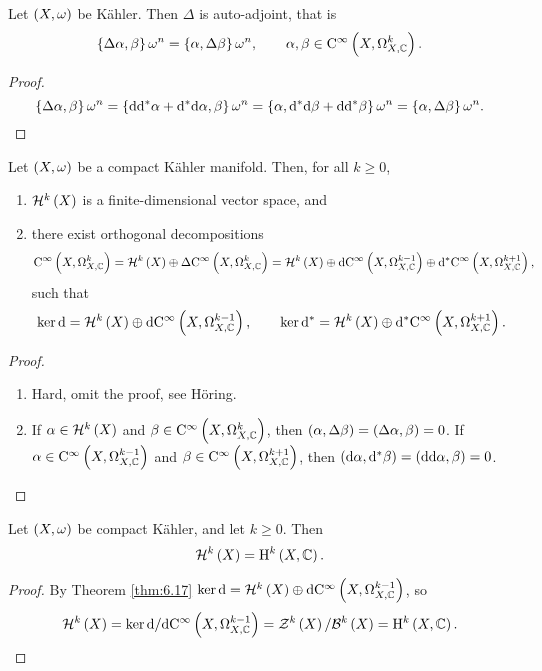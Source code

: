 \begin{lemma}
Let $ \br{X, \omega} $ be K\"ahler. Then $ \Delta $ is auto-adjoint, that is
$$ \cbr{\Delta\alpha, \beta}\omega^n = \cbr{\alpha, \Delta\beta}\omega^n, \qquad \alpha, \beta \in \COC{X}{k}. $$
\end{lemma}

\begin{proof}
$$ \cbr{\Delta\alpha, \beta}\omega^n = \cbr{\d\d^*\alpha + \d^*\d\alpha, \beta}\omega^n = \cbr{\alpha, \d^*\d\beta + \d\d^*\beta}\omega^n = \cbr{\alpha, \Delta\beta}\omega^n. $$
\end{proof}

\begin{theorem}
\label{thm:6.17}
Let $ \br{X, \omega} $ be a compact K\"ahler manifold. Then, for all $ k \ge 0 $,
\begin{enumerate}
\item $ \HHH^k\br{X} $ is a finite-dimensional vector space, and
\item there exist orthogonal decompositions
$$ \COC{X}{k} = \HHH^k\br{X} \oplus \Delta\COC{X}{k} = \HHH^k\br{X} \oplus \d\COC{X}{k - 1} \oplus \d^*\COC{X}{k + 1}, $$
such that
$$ \ker \d = \HHH^k\br{X} \oplus \d\COC{X}{k - 1}, \qquad \ker \d^* = \HHH^k\br{X} \oplus \d^*\COC{X}{k + 1}. $$
\end{enumerate}
\end{theorem}

\begin{proof}
\hfill
\begin{enumerate}
\item Hard, omit the proof, see H\"oring.
\item If $ \alpha \in \HHH^k\br{X} $ and $ \beta \in \COC{X}{k} $, then $ \br{\alpha, \Delta\beta} = \br{\Delta\alpha, \beta} = 0 $. If $ \alpha \in \COC{X}{k - 1} $ and $ \beta \in \COC{X}{k + 1} $, then $ \br{\d\alpha, \d^*\beta} = \br{\d\d\alpha, \beta} = 0 $.
\end{enumerate}
\end{proof}

\pagebreak

\begin{theorem}
\label{thm:6.18}
Let $ \br{X, \omega} $ be compact K\"ahler, and let $ k \ge 0 $. Then
$$ \HHH^k\br{X} = \H^k\br{X, \CC}. $$
\end{theorem}

\begin{proof}
By Theorem \ref{thm:6.17} $ \ker \d = \HHH^k\br{X} \oplus \d\COC{X}{k - 1} $, so
$$ \HHH^k\br{X} = \ker \d / \d\COC{X}{k - 1} = \ZZZ^k\br{X} / \BBB^k\br{X} = \H^k\br{X, \CC}. $$
\end{proof}

